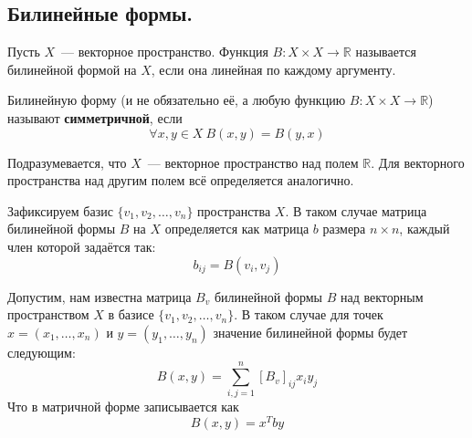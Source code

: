 \documentclass[11pt]{report}
\begin{document}
    \subsection{Билинейные формы.}

    \begin{definition}
    Пусть $X$~--- векторное пространство. Функция $B: X \times X \to \mathbb{R}$ называется билинейной формой на $X$, если она линейная по каждому аргументу.
    \end{definition}

    \begin{remark}
    Билинейную форму (и не обязательно её, а любую функцию $B: X \times X \to \mathbb{R}$) называют \textbf{симметричной}, если
    \begin{equation*}
        \forall x, y \in X \ B(x, y) = B(y, x)
    \end{equation*}
    \end{remark}

    \begin{remark}
    Подразумевается, что $X$~--- векторное пространство над полем $\mathbb{R}$. Для векторного пространства над другим полем всё определяется аналогично.
    \end{remark}

    \begin{definition}
    Зафиксируем базис $\{v_1, v_2, \hdots, v_n\}$ пространства $X$. В таком случае матрица билинейной формы $B$ на $X$ определяется как матрица $b$ размера $n \times n$, каждый член которой задаётся так:
    \begin{equation*}
        b_{ij} = B(v_i, v_j)
    \end{equation*}
    \end{definition}

    \begin{remark}
    Допустим, нам известна матрица $B_{v}$ билинейной формы $B$ над векторным пространством $X$ в базисе $\{v_1, v_2, \hdots, v_n\}$. В таком случае для точек $x = (x_1, \hdots, x_n)$ и $y = (y_1, \hdots, y_n)$ значение билинейной формы будет следующим:
    \begin{equation*}
        B(x, y) = \sum_{i, j = 1}^{n} [B_{v}]_{ij} x_i y_j
    \end{equation*}
    Что в матричной форме записывается как
    \begin{equation*}
        B(x, y) = x^{T} b y
    \end{equation*}
    \end{remark}
\end{document}
